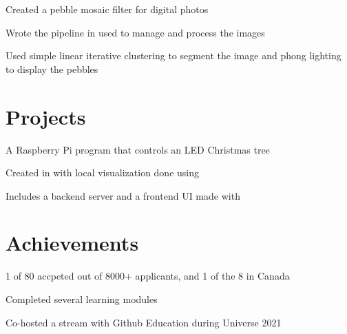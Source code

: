 \documentclass[]{deedy-resume-openfont}
\begin{document}
\begin{minipage}[t]{0.66\textwidth}
\begin{tightemize}
\end{tightemize}
\sectionsep
{}
\begin{tightemize}

\item Created a pebble mosaic filter for digital photos

\item Wrote the pipeline in used to manage and process the images

\item Used simple linear iterative clustering to segment the image and phong lighting to display the pebbles

\end{tightemize}
\sectionsep

\section{Projects}

\begin{tightemize}

\item A Raspberry Pi program that controls an LED Christmas tree

\item Created in with local visualization done using 

\item Includes a backend server and a frontend UI made with 

\end{tightemize}
\sectionsep

\section{Achievements}

\begin{tightemize}
\item 1 of 80 accpeted out of 8000+ applicants, and 1 of the 8 in Canada
\item Completed several learning modules
\item Co-hosted a stream with Github Education during Universe 2021
\end{tightemize}
\sectionsep


\end{minipage}
\end{document}
